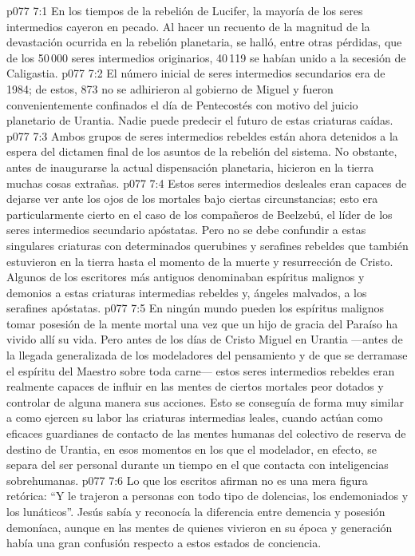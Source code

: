 \vs p077 7:1 En los tiempos de la rebelión de Lucifer, la mayoría de los seres intermedios cayeron en pecado. Al hacer un recuento de la magnitud de la devastación ocurrida en la rebelión planetaria, se halló, entre otras pérdidas, que de los 50\,000 seres intermedios originarios, 40\,119 se habían unido a la secesión de Caligastia.
\vs p077 7:2 El número inicial de seres intermedios secundarios era de 1984; de estos, 873 no se adhirieron al gobierno de Miguel y fueron convenientemente confinados el día de Pentecostés con motivo del juicio planetario de Urantia. Nadie puede predecir el futuro de estas criaturas caídas.
\vs p077 7:3 Ambos grupos de seres intermedios rebeldes están ahora detenidos a la espera del dictamen final de los asuntos de la rebelión del sistema. No obstante, antes de inaugurarse la actual dispensación planetaria, hicieron en la tierra muchas cosas extrañas.
\vs p077 7:4 Estos seres intermedios desleales eran capaces de dejarse ver ante los ojos de los mortales bajo ciertas circunstancias; esto era particularmente cierto en el caso de los compañeros de Beelzebú, el líder de los seres intermedios secundario apóstatas. Pero no se debe confundir a estas singulares criaturas con determinados querubines y serafines rebeldes que también estuvieron en la tierra hasta el momento de la muerte y resurrección de Cristo. Algunos de los escritores más antiguos denominaban espíritus malignos y demonios a estas criaturas intermedias rebeldes y, ángeles malvados, a los serafines apóstatas.
\vs p077 7:5 En ningún mundo pueden los espíritus malignos tomar posesión de la mente mortal una vez que un hijo de gracia del Paraíso ha vivido allí su vida. Pero antes de los días de Cristo Miguel en Urantia ---antes de la llegada generalizada de los modeladores del pensamiento y de que se derramase el espíritu del Maestro sobre toda carne--- estos seres intermedios rebeldes eran realmente capaces de influir en las mentes de ciertos mortales peor dotados y controlar de alguna manera sus acciones. Esto se conseguía de forma muy similar a como ejercen su labor las criaturas intermedias leales, cuando actúan como eficaces guardianes de contacto de las mentes humanas del colectivo de reserva de destino de Urantia, en esos momentos en los que el modelador, en efecto, se separa del ser personal durante un tiempo en el que contacta con inteligencias sobrehumanas.
\vs p077 7:6 Lo que los escritos afirman no es una mera figura retórica: “Y le trajeron a personas con todo tipo de dolencias, los endemoniados y los lunáticos”. Jesús sabía y reconocía la diferencia entre demencia y posesión demoníaca, aunque en las mentes de quienes vivieron en su época y generación había una gran confusión respecto a estos estados de conciencia.

